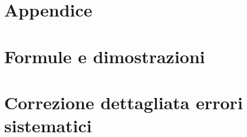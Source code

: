 \documentclass[12pt,a4paper]{article}
\begin{document}
\section*{Appendice}
  \appendix


\section{Formule e dimostrazioni}\label{sec:formule-e-dimostrazioni}

  


\section{Correzione dettagliata errori sistematici}\label{sec:correzione-dettagliata-errori-sistematici}

  
\end{document}
